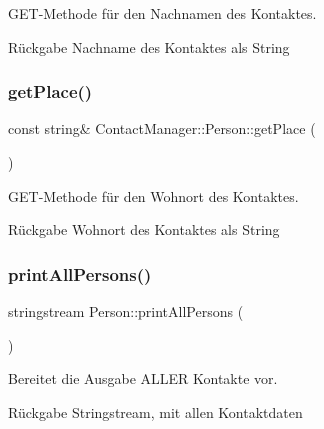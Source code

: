 G\+E\+T-\/\+Methode für den Nachnamen des Kontaktes.

\begin{DoxyReturn}{Rückgabe}
Nachname des Kontaktes als String
\end{DoxyReturn}
\mbox{\label{classContactManager_1_1Person_a27adc1676f898aeadf2e372f0d158715}} 
\subsubsection{\texorpdfstring{get\+Place()}{getPlace()}}
{\footnotesize\ttfamily const string\& Contact\+Manager\+::\+Person\+::get\+Place (\begin{DoxyParamCaption}{ }\end{DoxyParamCaption})\hspace{0.3cm}{\ttfamily [inline]}}



G\+E\+T-\/\+Methode für den Wohnort des Kontaktes.

\begin{DoxyReturn}{Rückgabe}
Wohnort des Kontaktes als String
\end{DoxyReturn}
\mbox{\label{classContactManager_1_1Person_a781616d2e1b0ebe4601b3914d4a03bc3}} 
\subsubsection{\texorpdfstring{print\+All\+Persons()}{printAllPersons()}}
{\footnotesize\ttfamily stringstream Person\+::print\+All\+Persons (\begin{DoxyParamCaption}{ }\end{DoxyParamCaption})}



Bereitet die Ausgabe A\+L\+L\+ER Kontakte vor.

\begin{DoxyReturn}{Rückgabe}
Stringstream, mit allen Kontaktdaten
\end{DoxyReturn}
\mbox{\label{classContactManager_1_1Person_ab1be17c0aac5d094a6fd94d9e1fa7ed4}} 
